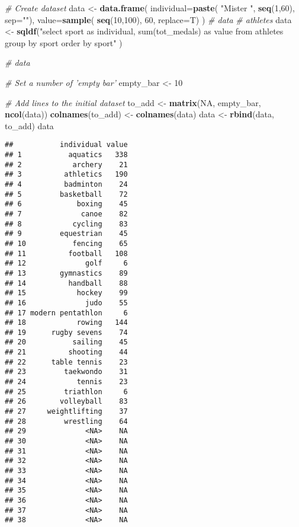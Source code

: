 \documentclass[]{article}
\newenvironment{Shaded}{\begin{snugshade}}{\end{snugshade}}
\newcommand{\CommentTok}[1]{\textcolor[rgb]{0.56,0.35,0.01}{\textit{#1}}}
\newcommand{\DataTypeTok}[1]{\textcolor[rgb]{0.13,0.29,0.53}{#1}}
\newcommand{\DecValTok}[1]{\textcolor[rgb]{0.00,0.00,0.81}{#1}}
\newcommand{\KeywordTok}[1]{\textcolor[rgb]{0.13,0.29,0.53}{\textbf{#1}}}
\newcommand{\NormalTok}[1]{#1}
\newcommand{\OtherTok}[1]{\textcolor[rgb]{0.56,0.35,0.01}{#1}}
\newcommand{\StringTok}[1]{\textcolor[rgb]{0.31,0.60,0.02}{#1}}
\begin{document}
\begin{Shaded}
\begin{Highlighting}[]
\CommentTok{# Create dataset}
\NormalTok{data <-}\StringTok{ }\KeywordTok{data.frame}\NormalTok{(}
  \DataTypeTok{individual=}\KeywordTok{paste}\NormalTok{( }\StringTok{"Mister "}\NormalTok{, }\KeywordTok{seq}\NormalTok{(}\DecValTok{1}\NormalTok{,}\DecValTok{60}\NormalTok{), }\DataTypeTok{sep=}\StringTok{""}\NormalTok{),}
  \DataTypeTok{value=}\KeywordTok{sample}\NormalTok{( }\KeywordTok{seq}\NormalTok{(}\DecValTok{10}\NormalTok{,}\DecValTok{100}\NormalTok{), }\DecValTok{60}\NormalTok{, }\DataTypeTok{replace=}\NormalTok{T)}
\NormalTok{)}
 \CommentTok{# data}
 \CommentTok{# athletes}
\NormalTok{data <-}\StringTok{ }\KeywordTok{sqldf}\NormalTok{(}\StringTok{"select sport as individual, sum(tot_medals) as value from athletes  group by sport order by sport"}\NormalTok{  )}

\CommentTok{# data}
    
\CommentTok{# Set a number of 'empty bar'}
\NormalTok{empty_bar <-}\StringTok{ }\DecValTok{10}
 
\CommentTok{# Add lines to the initial dataset}
\NormalTok{to_add <-}\StringTok{ }\KeywordTok{matrix}\NormalTok{(}\OtherTok{NA}\NormalTok{, empty_bar, }\KeywordTok{ncol}\NormalTok{(data))}
\KeywordTok{colnames}\NormalTok{(to_add) <-}\StringTok{ }\KeywordTok{colnames}\NormalTok{(data)}
\NormalTok{data <-}\StringTok{ }\KeywordTok{rbind}\NormalTok{(data, to_add)}
\NormalTok{data}
\end{Highlighting}
\end{Shaded}

\begin{verbatim}
##           individual value
## 1           aquatics   338
## 2            archery    21
## 3          athletics   190
## 4          badminton    24
## 5         basketball    72
## 6             boxing    45
## 7              canoe    82
## 8            cycling    83
## 9         equestrian    45
## 10           fencing    65
## 11          football   108
## 12              golf     6
## 13        gymnastics    89
## 14          handball    88
## 15            hockey    99
## 16              judo    55
## 17 modern pentathlon     6
## 18            rowing   144
## 19      rugby sevens    74
## 20           sailing    45
## 21          shooting    44
## 22      table tennis    23
## 23         taekwondo    31
## 24            tennis    23
## 25         triathlon     6
## 26        volleyball    83
## 27     weightlifting    37
## 28         wrestling    64
## 29              <NA>    NA
## 30              <NA>    NA
## 31              <NA>    NA
## 32              <NA>    NA
## 33              <NA>    NA
## 34              <NA>    NA
## 35              <NA>    NA
## 36              <NA>    NA
## 37              <NA>    NA
## 38              <NA>    NA
\end{verbatim}
\end{document}
